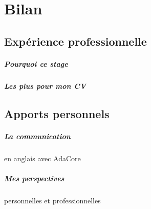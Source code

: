 \chapter{Bilan}

\section{Expérience professionnelle}
\paragraph{Pourquoi ce stage}
\paragraph{Les plus pour mon CV}

\section{Apports personnels}
\paragraph{La communication} en anglais avec AdaCore
\paragraph{Mes perspectives} personnelles et professionnelles


